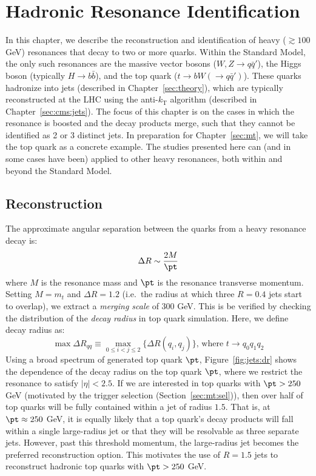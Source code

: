 \chapter{Hadronic Resonance Identification}
\label{sec:jets}

In this chapter, we describe the reconstruction and identification of heavy ($\gtrsim 100$ GeV) resonances that decay to two or more quarks.
Within the Standard Model, the only such resonances are the massive vector bosons ($W,Z\rightarrow q\bar{q}'$), the Higgs boson (typically $H\rightarrow b\bar{b}$), and the top quark ($t\rightarrow bW(\rightarrow q\bar{q}')$).
These quarks hadronize into jets (described in Chapter~\ref{sec:theory}), which are typically reconstructed at the LHC using the anti-$k_\mathrm{T}$ algorithm (described in Chapter~\ref{sec:cms:jets}).
The focus of this chapter is on the cases in which the resonance is boosted and the decay products merge, such that they cannot be identified as 2 or 3 distinct jets.
In preparation for Chapter~\ref{sec:mt}, we will take the top quark as a concrete example.
The studies presented here can (and in some cases have been) applied to other heavy resonances, both within and beyond the Standard Model.

\section{Reconstruction}
\label{sec:jets:reco}

The approximate angular separation between the quarks from a heavy resonance decay is\needcite:
\begin{equation}
    \Delta R \sim \frac{2M}{\pt}
\end{equation}
where $M$ is the resonance mass and $\pt$ is the resonance transverse momentum.
Setting $M=m_t$ and $\Delta R=1.2$ (i.e.~the radius at which three $R=0.4$ jets start to overlap), we extract a \emph{merging scale} of $300$ GeV.  
This is be verified by checking the distribution of the \emph{decay radius} in top quark simulation.
Here, we define decay radius as: 
\begin{equation}
    \max\Delta R_{qq} \equiv \displaystyle\max_{0\leq i < j \leq 2} \{\Delta R(q_i,q_j)\} \text{, where } t\rightarrow q_0q_1q_2
\end{equation}
Using a broad spectrum of generated top quark $\pt$, Figure~\ref{fig:jets:dr} shows the dependence of the decay radius on the top quark $\pt$, where we restrict the resonance to satisfy $|\eta|<2.5$.
If we are interested in top quarks with $\pt>250$ GeV (motivated by the trigger selection (Section~\ref{sec:mt:sel})), then over half of top quarks will be fully contained within a jet of radius $1.5$.
That is, at $\pt\approx 250$ GeV, it is equally likely that a top quark's decay products will fall within a single large-radius jet or that they will be resolvable as three separate jets. 
However, past this threshold momentum, the large-radius jet becomes the preferred reconstruction option.
This motivates the use of $R=1.5$ jets to reconstruct hadronic top quarks with $\pt>250$ GeV. 

